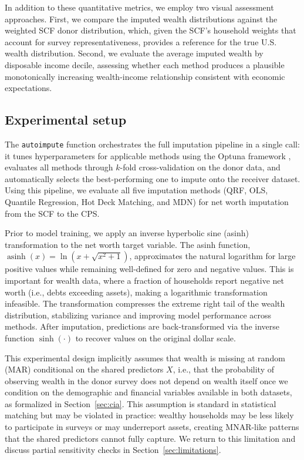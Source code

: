 In addition to these quantitative metrics, we employ two visual assessment approaches. First, we compare the imputed wealth distributions against the weighted SCF donor distribution, which, given the SCF's household weights that account for survey representativeness, provides a reference for the true U.S. wealth distribution. Second, we evaluate the average imputed wealth by disposable income decile, assessing whether each method produces a plausible monotonically increasing wealth-income relationship consistent with economic expectations.

\subsection{Experimental setup}\label{sec:experimental_setup}

The \texttt{autoimpute} function orchestrates the full imputation pipeline in a single call: it tunes hyperparameters for applicable methods using the Optuna framework \citep{akiba2019optuna}, evaluates all methods through $k$-fold cross-validation on the donor data, and automatically selects the best-performing one to impute onto the receiver dataset. Using this pipeline, we evaluate all five imputation methods (QRF, OLS, Quantile Regression, Hot Deck Matching, and MDN) for net worth imputation from the SCF to the CPS.

Prior to model training, we apply an inverse hyperbolic sine (asinh) transformation to the net worth target variable. The asinh function, $\operatorname{asinh}(x) = \ln(x + \sqrt{x^2 + 1})$, approximates the natural logarithm for large positive values while remaining well-defined for zero and negative values. This is important for wealth data, where a fraction of households report negative net worth (i.e., debts exceeding assets), making a logarithmic transformation infeasible. The transformation compresses the extreme right tail of the wealth distribution, stabilizing variance and improving model performance across methods. After imputation, predictions are back-transformed via the inverse function $\sinh(\cdot)$ to recover values on the original dollar scale.

This experimental design implicitly assumes that wealth is missing at random (MAR) conditional on the shared predictors $X$, i.e., that the probability of observing wealth in the donor survey does not depend on wealth itself once we condition on the demographic and financial variables available in both datasets, as formalized in Section~\ref{sec:cia}. This assumption is standard in statistical matching but may be violated in practice: wealthy households may be less likely to participate in surveys or may underreport assets, creating MNAR-like patterns that the shared predictors cannot fully capture. We return to this limitation and discuss partial sensitivity checks in Section~\ref{sec:limitations}.

